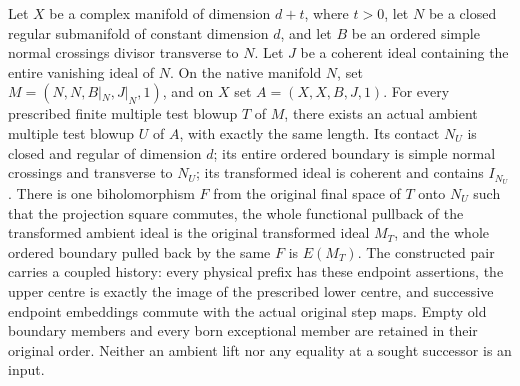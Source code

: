 \begin{theorem}
\label{hir:disjoint-finite-controlled-history}
\leanok
Let $X$ be a complex manifold of dimension $d+t$, where $t>0$, let $N$ be a
closed regular submanifold of constant dimension $d$, and let $B$ be an
ordered simple normal crossings divisor transverse to $N$. Let $J$ be a
coherent ideal containing the entire vanishing ideal of $N$. On the native
manifold $N$, set $M=(N,N,B|_N,J|_N,1)$, and on $X$ set
$A=(X,X,B,J,1)$. For every prescribed finite multiple test blowup $T$ of $M$,
there exists an actual ambient multiple test blowup $U$ of $A$, with exactly
the same length. Its contact $N_U$ is closed and regular of dimension $d$;
its entire ordered boundary is simple normal crossings and transverse to
$N_U$; its transformed ideal is coherent and contains $I_{N_U}$.
There is one biholomorphism $F$ from the original final space of $T$ onto
$N_U$ such that the projection square commutes, the whole functional
pullback of the transformed ambient ideal is the original transformed ideal
$M_T$, and the whole ordered boundary pulled back by the same $F$ is
$E(M_T)$. The constructed pair carries a coupled history: every physical
prefix has these endpoint assertions, the upper centre is exactly the image
of the prescribed lower centre, and successive endpoint embeddings commute
with the actual original step maps. Empty old boundary members and every born exceptional member are
retained in their original order. Neither an ambient lift nor any equality
at a sought successor is an input.
\end{theorem}

